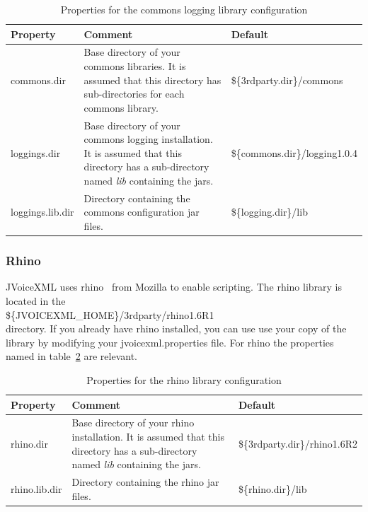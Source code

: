\documentclass[11pt,a4paper]{article}
\begin{document}
\begin{table}[h]
\caption{Properties for the commons logging library configuration}
\label{tab:logging_properties}

\begin{center}

\begin{tabular}{|l|p{4cm}|l|}
\hline
\textbf{Property} & \textbf{Comment} & \textbf{Default} \\
\hline
\hline
commons.dir & 
Base directory of your commons libraries. It is assumed
that this directory has sub-directories for each
commons library.
& \$\{3rdparty.dir\}/commons \\
\hline
loggings.dir & 
Base directory of your commons logging installation.
It is assumed that this directory
has a sub-directory named \emph{lib} containing the jars.
& \$\{commons.dir\}/logging1.0.4 \\
\hline
loggings.lib.dir & 
Directory containing the commons configuration jar files.
& \$\{logging.dir\}/lib \\
\hline
\end{tabular}

\end{center}

\end{table}

\subsubsection{Rhino}
\label{sec:rhino}

JVoiceXML uses rhino~\cite{rhino} from Mozilla to enable scripting.
The rhino library is located in the \\
\$\{JVOICEXML\_HOME\}/3rdparty/rhino1.6R1 \\
directory. If you already have rhino installed, you can use
use your copy of the library by modifying your jvoicexml.properties file.
For rhino the properties named in table~\ref{tab:rhino_properties} are 
relevant.

\begin{table}[h]
\caption{Properties for the rhino library configuration}
\label{tab:rhino_properties}

\begin{center}

\begin{tabular}{|l|p{4cm}|l|}
\hline
\textbf{Property} & \textbf{Comment} & \textbf{Default} \\
\hline
\hline
rhino.dir & 
Base directory of your rhino installation.
It is assumed that this directory
has a sub-directory named \emph{lib} containing the jars.
& \$\{3rdparty.dir\}/rhino1.6R2 \\
\hline
rhino.lib.dir & 
Directory containing the rhino jar files.
& \$\{rhino.dir\}/lib \\
\hline
\end{tabular}

\end{center}

\end{table}
\end{document}
